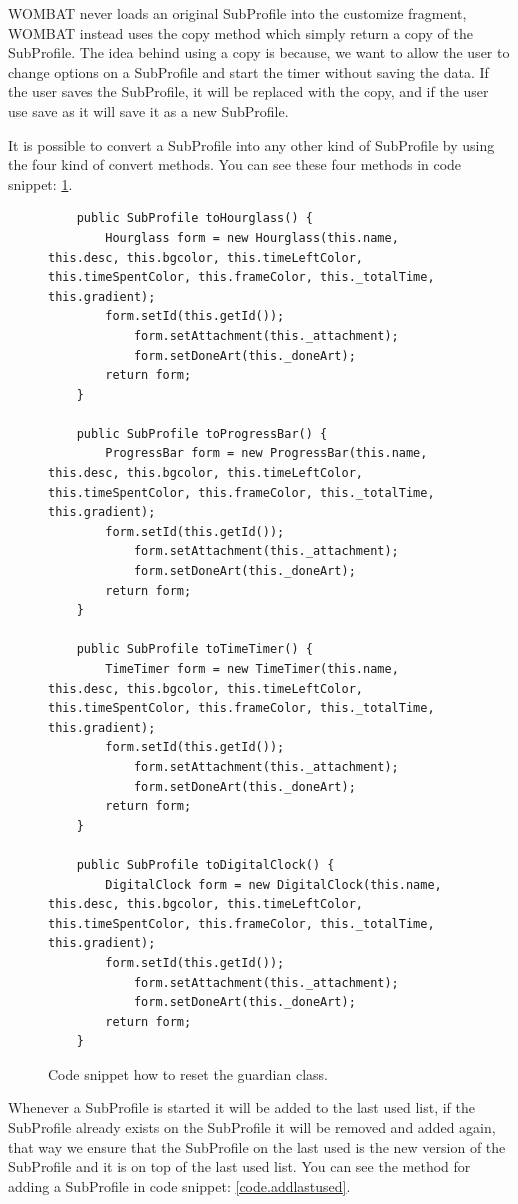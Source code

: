 \begin{description}
	WOMBAT never loads an original SubProfile into the customize fragment, WOMBAT instead uses the copy method which simply return a copy of the SubProfile. The idea behind using a copy is because, we want to allow the user to change options on a SubProfile and start the timer without saving the data. If the user saves the SubProfile, it will be replaced with the copy, and if the user use save as it will save it as a new SubProfile.
	
	It is possible to convert a SubProfile into any other kind of SubProfile by using the four kind of convert methods. You can see these four methods in code snippet: \ref{code:convert}.
	
	\begin{figure}[H]
\begin{lstlisting}
	public SubProfile toHourglass() {
		Hourglass form = new Hourglass(this.name, this.desc, this.bgcolor, this.timeLeftColor, this.timeSpentColor, this.frameColor, this._totalTime, this.gradient);
		form.setId(this.getId());		
			form.setAttachment(this._attachment);
			form.setDoneArt(this._doneArt);
		return form;
	}

	public SubProfile toProgressBar() {
		ProgressBar form = new ProgressBar(this.name, this.desc, this.bgcolor, this.timeLeftColor, this.timeSpentColor, this.frameColor, this._totalTime, this.gradient);
		form.setId(this.getId());
			form.setAttachment(this._attachment);
			form.setDoneArt(this._doneArt);
		return form;
	}

	public SubProfile toTimeTimer() {
		TimeTimer form = new TimeTimer(this.name, this.desc, this.bgcolor, this.timeLeftColor, this.timeSpentColor, this.frameColor, this._totalTime, this.gradient);
		form.setId(this.getId());
			form.setAttachment(this._attachment);
			form.setDoneArt(this._doneArt);
		return form;
	}

	public SubProfile toDigitalClock() {
		DigitalClock form = new DigitalClock(this.name, this.desc, this.bgcolor, this.timeLeftColor, this.timeSpentColor, this.frameColor, this._totalTime, this.gradient);
		form.setId(this.getId());
			form.setAttachment(this._attachment);
			form.setDoneArt(this._doneArt);
		return form;
	}
\end{lstlisting}
\caption{Code snippet how to reset the guardian class.}%
\label{code:convert}%
\end{figure}
	
	Whenever a SubProfile is started it will be added to the last used list, if the SubProfile already exists on the SubProfile it will be removed and added again, that way we ensure that the SubProfile on the last used is the new version of the SubProfile and it is on top of the last used list. You can see the method for adding a SubProfile in code snippet: \ref{code.addlastused}.
	

\end{description}
